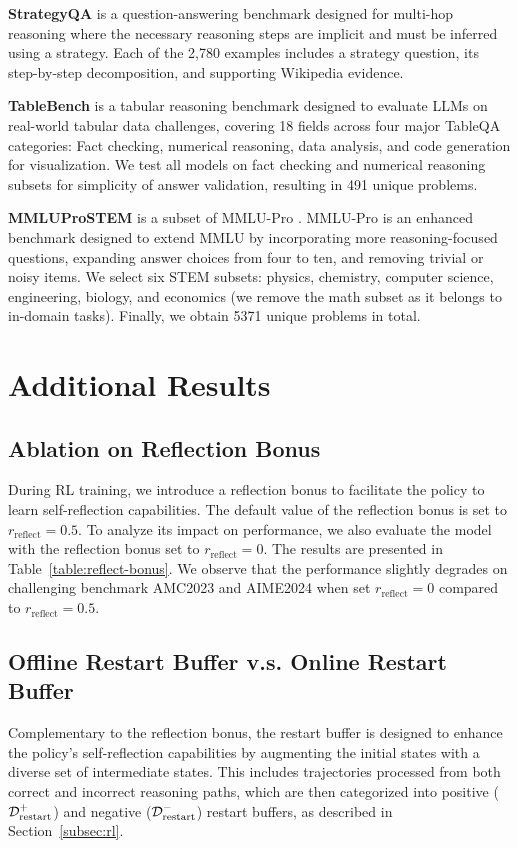 \textbf{StrategyQA} \cite{strategyqa} is a question-answering benchmark designed for multi-hop reasoning where the necessary reasoning steps are implicit and must be inferred using a strategy. Each of the 2,780 examples includes a strategy question, its step-by-step decomposition, and supporting Wikipedia evidence.

\textbf{TableBench} \cite{tablebench} is a tabular reasoning benchmark designed to evaluate LLMs on real-world tabular data challenges, covering 18 fields across four major TableQA categories: Fact checking, numerical reasoning, data analysis, and code generation for visualization. We test all models on fact checking and numerical reasoning subsets for simplicity of answer validation, resulting in 491 unique problems.

\textbf{MMLUProSTEM} is a subset of MMLU-Pro \cite{mmlupro}. MMLU-Pro is an enhanced benchmark designed to extend MMLU \cite{mmlu} by incorporating more reasoning-focused questions, expanding answer choices from four to ten, and removing trivial or noisy items. We select six STEM subsets: physics, chemistry, computer science, engineering, biology, and economics (we remove the math subset as it belongs to in-domain tasks). Finally, we obtain 5371 unique problems in total.


\section{Additional Results} \label{app:results}

\subsection{Ablation on Reflection Bonus}

During RL training, we introduce a reflection bonus to facilitate the policy to learn self-reflection capabilities. The default value of the reflection bonus is set to $r_{\text{reflect}}=0.5$. To analyze its impact on performance, we also evaluate the model with the reflection bonus set to $r_{\text{reflect}}=0$. The results are presented in Table~\ref{table:reflect-bonus}. We observe that the performance slightly degrades on challenging benchmark AMC2023 and AIME2024 when set $r_{\text{reflect}}=0$ compared to $r_{\text{reflect}}=0.5$.


\subsection{Offline Restart Buffer v.s. Online Restart Buffer}
Complementary to the reflection bonus, the restart buffer is designed to enhance the policy's self-reflection capabilities by augmenting the initial states with a diverse set of intermediate states. This includes trajectories processed from both correct and incorrect reasoning paths, which are then categorized into positive ($\mathcal{D}^+_{\text{restart}}$) and negative ($\mathcal{D}^-_{\text{restart}}$) restart buffers, as described in Section~\ref{subsec:rl}.

